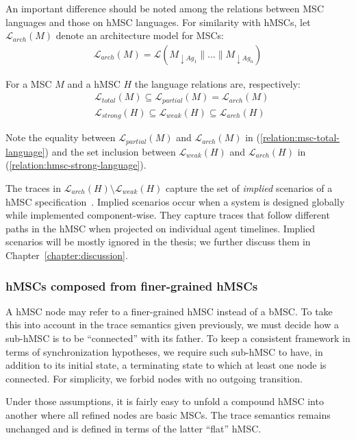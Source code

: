 An important difference should be noted among the relations between MSC languages and those on hMSC languages. For similarity with hMSCs, let $\mathcal{L}_{arch}(M)$ denote an architecture model for MSCs:
\begin{align*}
\mathcal{L}_{arch}(M) = \mathcal{L}(M_{\downarrow Ag_1}\parallel\ldots\parallel M_{\downarrow Ag_n})
\end{align*}

\noindent For a MSC $M$ and a hMSC $H$ the language relations are, respectively:
\begin{align}
&\mathcal{L}_{total}(M) \subseteq \mathcal{L}_{partial}(M) = \mathcal{L}_{arch}(M) \label{relation:msc-total-language}\\
&\mathcal{L}_{strong}(H) \subseteq \mathcal{L}_{weak}(H) \subseteq \mathcal{L}_{arch}(H) \label{relation:hmsc-strong-language}
\end{align}

Note the equality between $\mathcal{L}_{partial}(M)$ and $\mathcal{L}_{arch}(M)$ in (\ref{relation:msc-total-language}) and the set inclusion between $\mathcal{L}_{weak}(H)$ and $\mathcal{L}_{arch}(H)$ in (\ref{relation:hmsc-strong-language}). 

The traces in $\mathcal{L}_{arch}(H) \setminus \mathcal{L}_{weak}(H)$ capture the set of \emph{implied} scenarios of a hMSC specification~\cite{Alur:2000, Uchitel:2004}. Implied scenarios occur when a system is designed globally while implemented component-wise. They capture traces that follow different paths in the hMSC when projected on individual agent timelines. Implied scenarios will be mostly ignored in the thesis; we further discuss them in Chapter~\ref{chapter:discussion}.

\subsubsection*{hMSCs composed from finer-grained hMSCs\label{subsubsection:hMSC-with-sub-hMSC}}

A hMSC node may refer to a finer-grained hMSC instead of a bMSC. To take this into account in the trace semantics given previously, we must decide how a sub-hMSC is to be ``connected'' with its father. To keep a consistent framework in terms of synchronization hypotheses, we require such sub-hMSC to have, in addition to its initial state, a terminating state to which at least one node is connected. For simplicity, we forbid nodes with no outgoing transition. 

Under those assumptions, it is fairly easy to unfold a compound hMSC into another where all refined nodes are basic MSCs. The trace semantics remains unchanged and is defined in terms of the latter ``flat'' hMSC. 

